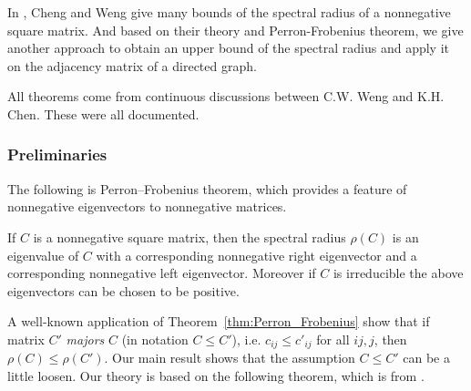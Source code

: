 \documentclass{beamer}
\begin{document}
\begin{frame}
    In \cite{chang}, Cheng and Weng give many bounds of the spectral radius
     of a nonnegative square matrix. And based on their theory and Perron-Frobenius
      theorem, we give another approach to obtain an upper bound of the spectral
       radius and apply it on the adjacency matrix of a directed graph.

    All theorems come from continuous discussions between C.W. Weng and K.H. Chen.
     These were all documented.\cite{src_files}
\end{frame}

\begin{frame}
    \label{thm:Perron_Frobenius}
    \frametitle{Preliminaries}
    The following is Perron–Frobenius theorem, which provides a feature of
 nonnegative eigenvectors to nonnegative matrices.

\begin{theorem} \cite{prn_fros2} 
    If $C$ is a nonnegative square matrix, then the spectral radius $\rho(C)$ is an
    eigenvalue of $C$ with a corresponding nonnegative right eigenvector and a
    corresponding nonnegative left eigenvector.
    Moreover if $C$ is irreducible the above eigenvectors can be chosen to be positive. 
\end{theorem}
\end{frame}

\begin{frame}
    A well-known application of Theorem~\ref{thm:Perron_Frobenius}
 show that if matrix  $C'$ {\it majors} $C$ (in notation $C\leq C'$),
 i.e. $c_{ij}\leq c'_{ij}$ for all $ij,j$, then $\rho(C)\leq \rho(C')$.
Our main result shows that the assumption $C\leq C'$ can be a little loosen. 
Our theory is based on the following theorem, which is from \cite{chang}.
\end{frame}
\end{document}
